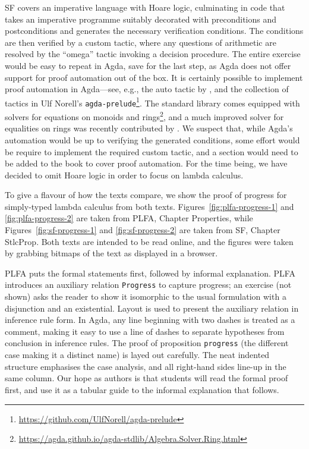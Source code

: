 \documentclass[preprint,authoryear]{elsarticle}
\begin{document}
SF covers an imperative language with Hoare logic, culminating in code that
takes an imperative programme suitably decorated with preconditions and
postconditions and generates the necessary verification conditions. The
conditions are then verified by a custom tactic, where any questions of
arithmetic are resolved by the ``omega'' tactic invoking a decision procedure.
The entire exercise would be easy to repeat in Agda, save for the last step, as
Agda does not offer support for proof automation out of the box. It is 
certainly possible to implement proof automation in Agda---see, e.g., the auto
tactic by \citet{Kokke-2015}, and the collection of tactics in Ulf Norell's
\texttt{agda-prelude}\footnote{\url{https://github.com/UlfNorell/agda-prelude}}.
The standard library comes equipped with solvers for equations on monoids and
rings\footnote{\url{https://agda.github.io/agda-stdlib/Algebra.Solver.Ring.html}},
and a much improved solver for equalities on rings was recently contributed by
\citet{Kidney-2019}.
We suspect that, while Agda's automation would be up to verifying the generated
conditions, some effort would be require to implement the required custom
tactic, and a section would need to be added to the book to cover proof
automation. For the time being, we have decided to omit Hoare logic in order to
focus on lambda calculus.

To give a flavour of how the texts compare, we show the
proof of progress for simply-typed lambda calculus from both texts.
Figures~\ref{fig:plfa-progress-1} and \ref{fig:plfa-progress-2}
are taken from PLFA, Chapter Properties,
while Figures~\ref{fig:sf-progress-1} and \ref{fig:sf-progress-2}
are taken from SF, Chapter StlcProp.
Both texts are intended to be read online,
and the figures were taken by grabbing bitmaps of the text as
displayed in a browser.

PLFA puts the formal statements first, followed by informal explanation.
PLFA introduces an auxiliary relation \texttt{Progress} to capture
progress; an exercise (not shown) asks the reader to show it isomorphic
to the usual formulation with a disjunction and an existential.
Layout is used to present the auxiliary relation in inference rule form.
In Agda, any line beginning with two dashes is treated as a comment, making
it easy to use a line of dashes to separate hypotheses from conclusion
in inference rules.  The proof of proposition \texttt{progress} (the different
case making it a distinct name) is layed out carefully. The neat
indented structure emphasises the case analysis, and all right-hand
sides line-up in the same column.  Our hope as authors is that students
will read the formal proof first, and use it as a tabular guide
to the informal explanation that follows.
\end{document}
